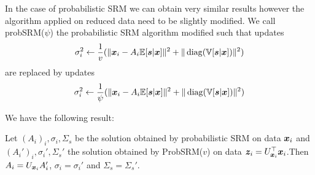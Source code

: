 In the case of probabilistic SRM we can obtain very similar results however the
algorithm applied on reduced data need to be slightly modified.
We call probSRM($\psi$) the probabilistic SRM algorithm modified such that
updates
\begin{align}
\sigma_i^2 \leftarrow \frac1{v} (\| \boldsymbol{x}_i - A_i \mathbb{E}[\boldsymbol{s}|\boldsymbol{x}]\|^2 + \| \operatorname*{diag}(\mathbb{V}[\boldsymbol{s} | \boldsymbol{x}]) \|^2)
\end{align}
are replaced by updates
\begin{align}
  \sigma_i^2 \leftarrow \frac1{\psi} (\| \boldsymbol{x}_i - A_i \mathbb{E}[\boldsymbol{s}|\boldsymbol{x}]\|^2 + \| \operatorname*{diag}(\mathbb{V}[\boldsymbol{s} | \boldsymbol{x}]) \|^2)
\end{align}

We have the following result:
\begin{prop}
  Let $(A_i)_i, \sigma_i, \Sigma_s$ be the solution obtained by probabilistic SRM on data
  $\boldsymbol{x}_i$ and $(A_i')_i, \sigma_i', \Sigma_s'$ the solution obtained by ProbSRM($v$) on
  data $\boldsymbol{z}_i = U_{\boldsymbol{x}_i}^{\top} \boldsymbol{x}_i$.Then $A_i = U_{\boldsymbol{x}_i}A_i'$, $\sigma_i =
  \sigma_i'$ and $\Sigma_s = \Sigma_s'$. 
  \label{prop:optimalprobsrm}
\end{prop}
